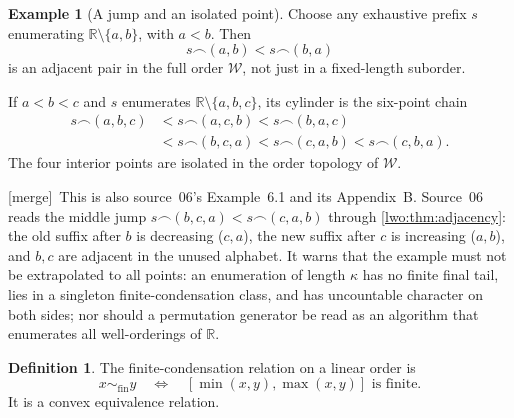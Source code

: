 \documentclass[11pt,a4paper]{article}
\theoremstyle{definition}
\newtheorem{definition}[theorem]{Definition}
\newtheorem{example}[theorem]{Example}
\theoremstyle{remark}
\newcommand{\R}{\mathbb R}
\newcommand{\W}{\mathcal W}
\newcommand{\cat}{\mathbin{\frown}}
\newcommand{\merge}{\textsf{[merge]}}
\begin{document}
\begin{example}[A jump and an isolated point]
Choose any exhaustive prefix $s$ enumerating
$\R\setminus\{a,b\}$, with $a<b$. Then
\[
                         s\cat(a,b)<s\cat(b,a)
\]
is an adjacent pair in the full order $\W$, not just in a fixed-length
suborder.

If $a<b<c$ and $s$ enumerates $\R\setminus\{a,b,c\}$, its cylinder is the
six-point chain
\[
\begin{split}
 s\cat(a,b,c)&<s\cat(a,c,b)<s\cat(b,a,c)\\
             &<s\cat(b,c,a)<s\cat(c,a,b)<s\cat(c,b,a).
\end{split}
\]
The four interior points are isolated in the order topology of $\W$.
\end{example}
\merge\ This is also source~06's Example~6.1 and its Appendix~B. Source~06
reads the middle jump $s\cat(b,c,a)<s\cat(c,a,b)$ through
\cref{lwo:thm:adjacency}: the old suffix after $b$ is decreasing ($c,a$), the
new suffix after $c$ is increasing ($a,b$), and $b,c$ are adjacent in the
unused alphabet. It warns that the example must not be extrapolated to all
points: an enumeration of length $\kappa$ has no finite final tail, lies in a
singleton finite-condensation class, and has uncountable character on both
sides; nor should a permutation generator be read as an algorithm that
enumerates all well-orderings of $\R$.

\begin{definition}
The finite-condensation relation on a linear order is
\[
        x\sim_{\mathrm{fin}}y\quad\Longleftrightarrow\quad
        [\min(x,y),\max(x,y)]\text{ is finite}.
\]
It is a convex equivalence relation.
\end{definition}
\end{document}
